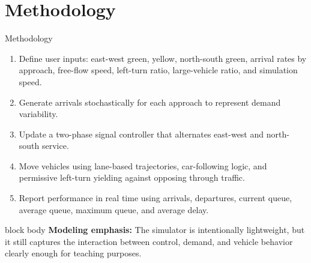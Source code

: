 \documentclass[aspectratio=169]{beamer}
\begin{document}
\section{Methodology}
\begin{frame}{Methodology}
  \begin{enumerate}
    \item Define user inputs: east-west green, yellow, north-south green, arrival rates by approach, free-flow speed, left-turn ratio, large-vehicle ratio, and simulation speed.
    \item Generate arrivals stochastically for each approach to represent demand variability.
    \item Update a two-phase signal controller that alternates east-west and north-south service.
    \item Move vehicles using lane-based trajectories, car-following logic, and permissive left-turn yielding against opposing through traffic.
    \item Report performance in real time using arrivals, departures, current queue, average queue, maximum queue, and average delay.
  \end{enumerate}

  \vspace{0.5em}
  \begin{beamercolorbox}[rounded=true,sep=0.7em,wd=\textwidth]{block body}
    \textbf{Modeling emphasis:} The simulator is intentionally lightweight, but it still captures the interaction between control, demand, and vehicle behavior clearly enough for teaching purposes.
  \end{beamercolorbox}
\end{frame}
\end{document}
